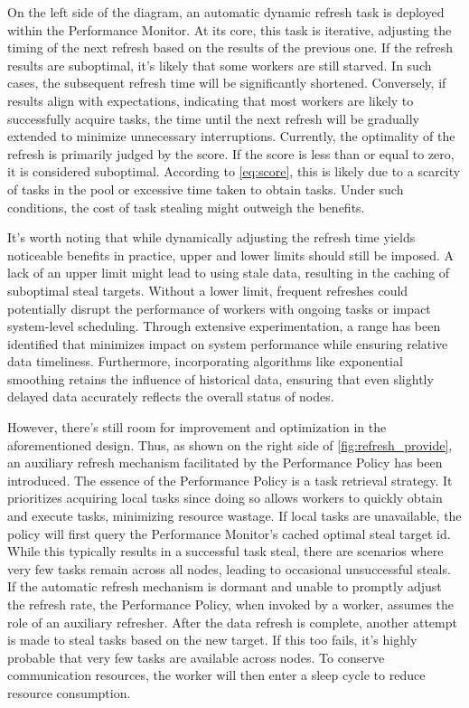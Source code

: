 \documentclass{mproj}
\begin{document}
On the left side of the diagram, an automatic dynamic refresh task is deployed within the Performance Monitor.
At its core, this task is iterative, adjusting the timing of the next refresh based on the results of the previous one.
If the refresh results are suboptimal, it's likely that some workers are still starved.
In such cases, the subsequent refresh time will be significantly shortened.
Conversely, if results align with expectations, indicating that most workers are likely to successfully acquire tasks,
the time until the next refresh will be gradually extended to minimize unnecessary interruptions.
Currently, the optimality of the refresh is primarily judged by the score.
If the score is less than or equal to zero, it is considered suboptimal.
According to \cref{eq:score}, this is likely due to a scarcity of tasks in the pool or excessive time taken to obtain tasks.
Under such conditions, the cost of task stealing might outweigh the benefits.

It's worth noting that while dynamically adjusting the refresh time yields noticeable benefits in practice,
upper and lower limits should still be imposed.
A lack of an upper limit might lead to using stale data, resulting in the caching of suboptimal steal targets.
Without a lower limit, frequent refreshes could potentially disrupt the performance of workers with ongoing tasks or impact system-level scheduling.
Through extensive experimentation, a range has been identified that minimizes impact on system performance while ensuring relative data timeliness.
Furthermore, incorporating algorithms like exponential smoothing retains the influence of historical data,
ensuring that even slightly delayed data accurately reflects the overall status of nodes.

However, there's still room for improvement and optimization in the aforementioned design.
Thus, as shown on the right side of \cref{fig:refresh_provide}, an auxiliary refresh mechanism facilitated by the Performance Policy has been introduced.
The essence of the Performance Policy is a task retrieval strategy.
It prioritizes acquiring local tasks since doing so allows workers to quickly obtain and execute tasks, minimizing resource wastage.
If local tasks are unavailable, the policy will first query the Performance Monitor's cached optimal steal target id.
While this typically results in a successful task steal, there are scenarios where very few tasks remain across all nodes,
leading to occasional unsuccessful steals.
If the automatic refresh mechanism is dormant and unable to promptly adjust the refresh rate,
the Performance Policy, when invoked by a worker, assumes the role of an auxiliary refresher.
After the data refresh is complete, another attempt is made to steal tasks based on the new target.
If this too fails, it's highly probable that very few tasks are available across nodes.
To conserve communication resources, the worker will then enter a sleep cycle to reduce resource consumption.
\end{document}
